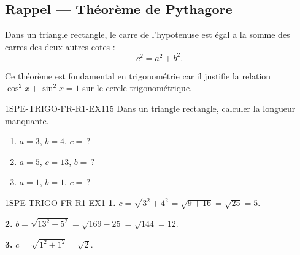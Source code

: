 

\subsection*{Rappel — Théorème de Pythagore}

Dans un triangle rectangle, le carre de l'hypotenuse est égal a la somme des carres des deux autres cotes :
\[
  c^2 = a^2 + b^2.
\]

Ce théorème est fondamental en trigonométrie car il justifie la relation $\cos^2 x + \sin^2 x = 1$ sur le cercle trigonométrique.

\begin{exercice}{1SPE-TRIGO-FR-R1-EX1}{1}{5}
Dans un triangle rectangle, calculer la longueur manquante.
\begin{enumerate}
  \item $a = 3$, $b = 4$, $c = \,?$
  \item $a = 5$, $c = 13$, $b = \,?$
  \item $a = 1$, $b = 1$, $c = \,?$
\end{enumerate}
\end{exercice}


\begin{corrige}{1SPE-TRIGO-FR-R1-EX1}
\textbf{1.} $c = \sqrt{3^2 + 4^2} = \sqrt{9+16} = \sqrt{25} = 5$.

\textbf{2.} $b = \sqrt{13^2 - 5^2} = \sqrt{169-25} = \sqrt{144} = 12$.

\textbf{3.} $c = \sqrt{1^2 + 1^2} = \sqrt{2}$.
\end{corrige}
